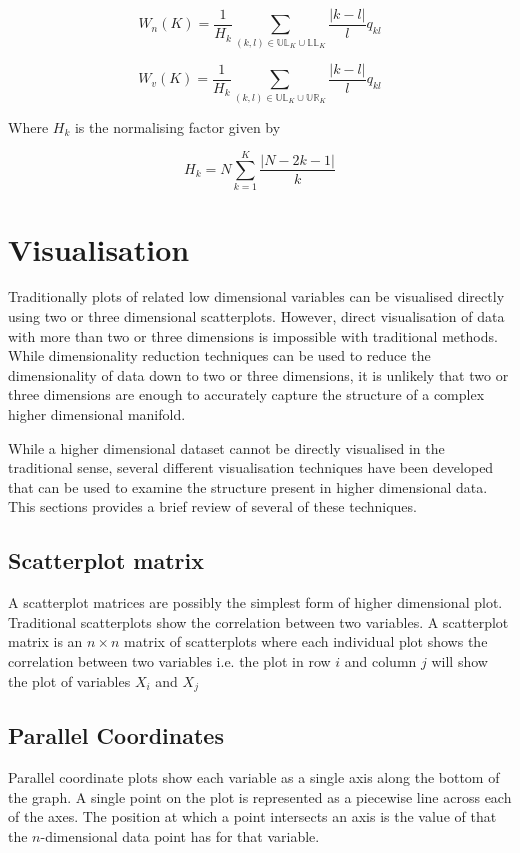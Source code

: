 \begin{equation}
	W_n(K) = \frac{1}{H_k} \sum\limits_{(k,l) \in \mathbb{UL}_K \cup \mathbb{LL}_K} \frac{| k - l |}{l} q_{kl}
\end{equation}

\begin{equation}
	W_v(K) = \frac{1}{H_k} \sum\limits_{(k,l) \in \mathbb{UL}_K \cup \mathbb{UR}_K} \frac{| k - l |}{l} q_{kl}
\end{equation}

Where $H_k$ is the normalising factor given by

\begin{equation}
	H_k = N \sum\limits_{k=1}^K \frac{| N - 2k -1 |}{k}
\end{equation}

\section{Visualisation}
\label{sec:visualisation}
Traditionally plots of related low dimensional variables can be visualised directly using two or three dimensional scatterplots. However, direct visualisation of data with more than two or three dimensions is impossible with traditional methods. While dimensionality reduction techniques can be used to reduce the dimensionality of data down to two or three dimensions, it is unlikely that two or three dimensions are enough to accurately capture the structure of a complex higher dimensional manifold.

While a higher dimensional dataset cannot be directly visualised in the traditional sense, several different visualisation techniques have been developed that can be used to examine the structure present in higher dimensional data. This sections provides a brief review of several of these techniques.

\subsection{Scatterplot matrix}
A scatterplot matrices are possibly the simplest form of higher dimensional plot. Traditional scatterplots show the correlation between two variables. A scatterplot matrix is an $n \times n$ matrix of scatterplots where each individual plot shows the correlation between two variables i.e. the plot in row $i$ and column $j$ will show the plot of variables $X_i$ and $X_j$ 

\subsection{Parallel Coordinates}
Parallel coordinate plots \cite{inselberg1991parallel} show each variable as a single axis along the bottom of the graph. A single point on the plot is represented as a piecewise line across each of the axes. The position at which a point intersects an axis is the value of that the $n$-dimensional data point has for that variable.

